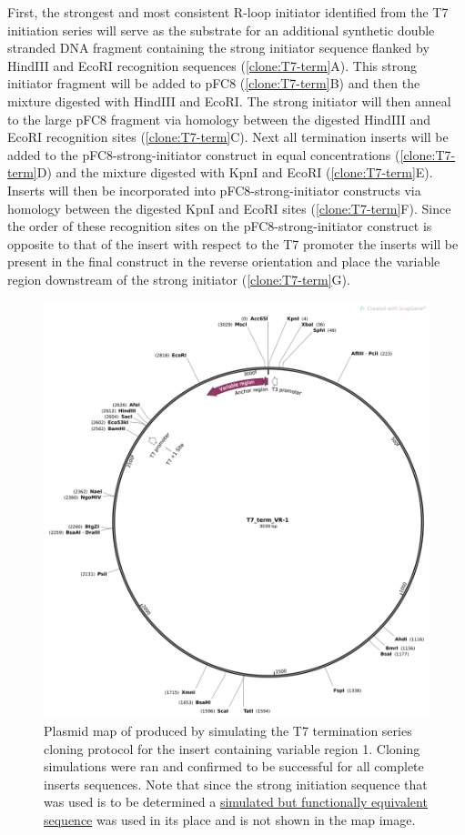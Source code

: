 \documentclass[11pt]{article}
\begin{document}
 First, the strongest and most consistent R-loop initiator identified from the T7 initiation series will serve as the substrate for an additional synthetic double stranded DNA fragment containing the strong initiator sequence flanked by  HindIII and EcoRI recognition sequences (\ref{clone:T7-term}A). This strong initiator fragment will be added to pFC8  (\ref{clone:T7-term}B) and then the mixture digested with HindIII and EcoRI. The strong initiator will then anneal to the large pFC8 fragment via homology between the digested HindIII and EcoRI recognition sites (\ref{clone:T7-term}C). Next all termination inserts will be added to the pFC8-strong-initiator construct in equal concentrations (\ref{clone:T7-term}D) and the mixture digested with KpnI and EcoRI (\ref{clone:T7-term}E). Inserts will then be incorporated into pFC8-strong-initiator constructs via homology between the digested KpnI and EcoRI sites (\ref{clone:T7-term}F). Since the order of these recognition sites on the pFC8-strong-initiator construct is opposite to that of the insert with respect to the T7 promoter the inserts will be present in the final construct in the reverse orientation and place the variable region downstream of the strong initiator (\ref{clone:T7-term}G). 
 
 \begin{figure}[H]
 	\includegraphics[width=12cm]{images/plasmid_maps/T7_term_VR-1 Map_simulated_assembly.png}
 	\centering
 	\caption{Plasmid map of produced by simulating the T7 termination series cloning protocol for the insert containing variable region 1. Cloning simulations were ran and confirmed to be successful for all complete inserts sequences. Note that since the strong initiation sequence that was used is to be determined a \href{https://github.com/EthanHolleman/plasmid-VR-design/blob/main/notes/placeholder_strong_initiator.ipynb}{simulated but functionally equivalent sequence} was used in its place and is not shown in the map image.}
 	\label{clone:T7-term-insert-simulated}
 \end{figure}
 
\end{document}
